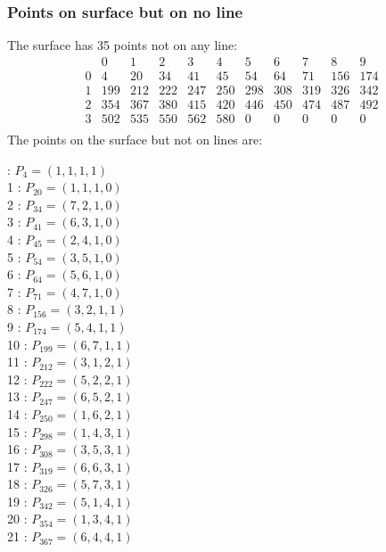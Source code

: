 \documentclass{article}
\begin{document}
{\subsubsection*{Points on surface but on no line}
The surface has 35 points not on any line:\\
$$
\begin{array}{r|*{10}{r}}
 & 0 & 1 & 2 & 3 & 4 & 5 & 6 & 7 & 8 & 9\\
\hline
0 & 4 & 20 & 34 & 41 & 45 & 54 & 64 & 71 & 156 & 174\\
1 & 199 & 212 & 222 & 247 & 250 & 298 & 308 & 319 & 326 & 342\\
2 & 354 & 367 & 380 & 415 & 420 & 446 & 450 & 474 & 487 & 492\\
3 & 502 & 535 & 550 & 562 & 580 & 0 & 0 & 0 & 0 & 0\\
\end{array}
$$
The points on the surface but not on lines are:\\
\begin{multicols}{2}
 : $P_{4}=( 1, 1, 1, 1 )$\\
1 : $P_{20}=( 1, 1, 1, 0 )$\\
2 : $P_{34}=( 7, 2, 1, 0 )$\\
3 : $P_{41}=( 6, 3, 1, 0 )$\\
4 : $P_{45}=( 2, 4, 1, 0 )$\\
5 : $P_{54}=( 3, 5, 1, 0 )$\\
6 : $P_{64}=( 5, 6, 1, 0 )$\\
7 : $P_{71}=( 4, 7, 1, 0 )$\\
8 : $P_{156}=( 3, 2, 1, 1 )$\\
9 : $P_{174}=( 5, 4, 1, 1 )$\\
10 : $P_{199}=( 6, 7, 1, 1 )$\\
11 : $P_{212}=( 3, 1, 2, 1 )$\\
12 : $P_{222}=( 5, 2, 2, 1 )$\\
13 : $P_{247}=( 6, 5, 2, 1 )$\\
14 : $P_{250}=( 1, 6, 2, 1 )$\\
15 : $P_{298}=( 1, 4, 3, 1 )$\\
16 : $P_{308}=( 3, 5, 3, 1 )$\\
17 : $P_{319}=( 6, 6, 3, 1 )$\\
18 : $P_{326}=( 5, 7, 3, 1 )$\\
19 : $P_{342}=( 5, 1, 4, 1 )$\\
20 : $P_{354}=( 1, 3, 4, 1 )$\\
21 : $P_{367}=( 6, 4, 4, 1 )$\\

\end{multicols}}
\end{document}
